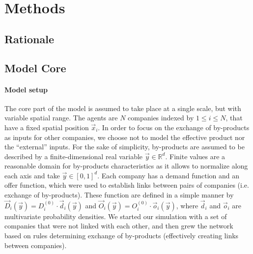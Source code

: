 \documentclass[fleqn,10pt]{wlscirep}
\begin{document}





\section*{Methods} \label{sec:methods} %


\subsection*{Rationale}




\subsection*{Model Core}


\paragraph*{Model setup}

The core part of the model is assumed to take place at a single scale, but with variable spatial range. The agents are $N$ companies indexed by $1\leq i\leq N$, that have a fixed spatial position $\vec{x}_i$. In order to focus on the exchange of by-products as inputs for other companies, we choose not to model the effective product nor the ``external'' inputs. For the sake of simplicity, by-products are assumed to be described by a finite-dimensional real variable $\vec{y}\in \mathbb{R}^d$. Finite values are a reasonable domain for by-products characteristics as it allows to normalize along each axis and take $\vec{y} \in \left[0,1\right]^d$. Each company has a demand function and an offer function, which were used to establish links between pairs of companies (i.e. exchange of by-products). These function are defined in a simple manner by $\vec{D}_i (\vec{y})= D_i^{(0)}\cdot \vec{d}_i (\vec{y})$ and $\vec{O}_i (\vec{y})= O_i^{(0)}\cdot \vec{o}_i (\vec{y})$, where $\vec{d}_i$ and $\vec{o}_i$ are multivariate probability densities. We started our simulation with a set of companies that were not linked with each other, and then grew the network based on rules determining exchange of by-products (effectively creating links between companies).
\end{document}
